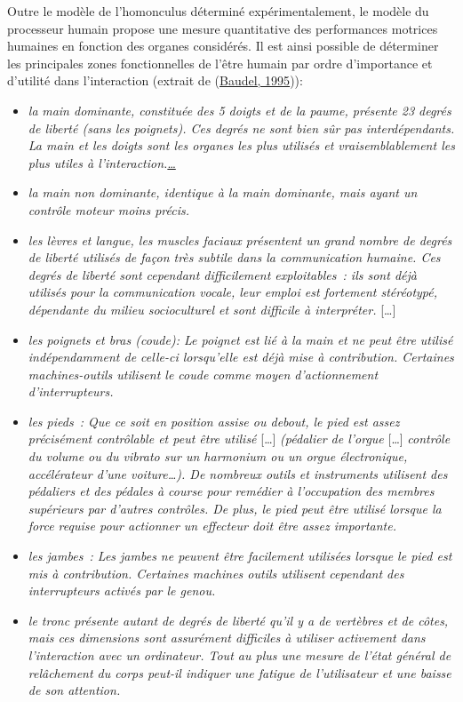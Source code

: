 \documentclass[
]{book}
\providecommand{\tightlist}{%
  \setlength{\itemsep}{0pt}\setlength{\parskip}{0pt}}
\begin{document}
Outre le modèle de l'homonculus déterminé expérimentalement, le modèle du
processeur humain propose une mesure quantitative des performances motrices
humaines en fonction des organes considérés. Il est ainsi possible de
déterminer les principales zones fonctionnelles de l'être humain par ordre
d'importance et d'utilité dans l'interaction (extrait de (\protect\hyperlink{ref-baudel1995aspects}{Baudel, 1995})):

\begin{itemize}
\tightlist
\item
  \emph{la} \emph{main dominante, constituée des 5
  doigts et de la paume, présente 23 degrés de liberté (sans les poignets).
  Ces degrés ne sont bien sûr pas interdépendants. La main et les doigts sont
  les organes les plus utilisés et vraisemblablement les plus utiles à
  l'interaction.}\href{\%5BSturman,\%201992\%5D(047-bibliographie.html\#Sturman1992)}{\ldots{}}
\item
  \emph{la main non dominante, identique à la main
  dominante, mais ayant un contrôle moteur moins précis.}
\item
  \emph{les lèvres et langue, les muscles faciaux
  présentent un grand nombre de degrés de liberté utilisés de façon très
  subtile dans la communication humaine. Ces degrés de liberté sont cependant
  difficilement exploitables~: ils sont déjà utilisés pour la communication
  vocale, leur emploi est fortement stéréotypé, dépendante du milieu
  socioculturel et sont difficile à interpréter.} {[}\ldots{]}
\item
  \emph{les poignets et bras (coude): Le poignet est lié
  à la main et ne peut être utilisé indépendamment de celle-ci lorsqu'elle
  est déjà mise à contribution. Certaines machines-outils utilisent le coude
  comme moyen d'actionnement d'interrupteurs.}
\item
  \emph{les pieds~: Que ce soit en position assise ou
  debout, le pied est assez précisément contrôlable et peut être utilisé}
  {[}\ldots{]} \emph{(pédalier de l'orgue} {[}\ldots{]} \emph{contrôle du volume ou du
  vibrato sur un harmonium ou un orgue électronique, accélérateur d'une
  voiture\ldots). De nombreux outils et instruments utilisent des pédaliers et
  des pédales à course pour remédier à l'occupation des membres supérieurs
  par d'autres contrôles. De plus, le pied peut être utilisé lorsque la force
  requise pour actionner un effecteur doit être assez importante.}
\item
  \emph{les jambes~: Les jambes ne peuvent être
  facilement utilisées lorsque le pied est mis à contribution. Certaines
  machines outils utilisent cependant des interrupteurs activés par le
  genou.}
\item
  \emph{le tronc présente autant de degrés de liberté
  qu'il y a de vertèbres et de côtes, mais ces dimensions sont assurément
  difficiles à utiliser activement dans l'interaction avec un ordinateur.
  Tout au plus une mesure de l'état général de relâchement du corps peut-il
  indiquer une fatigue de l'utilisateur et une baisse de son
  attention.}
\end{itemize}
\end{document}
